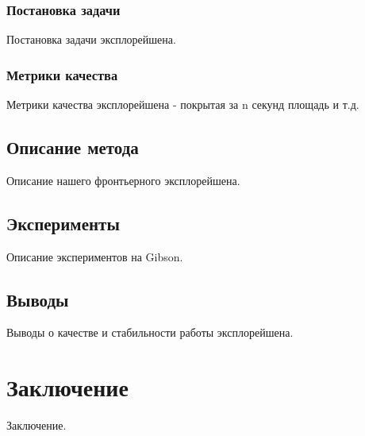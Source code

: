 \documentclass{mipt-thesis-ms}
\begin{document}
	\subsection{Постановка задачи}
	
	Постановка задачи эксплорейшена.
	
	\subsection{Метрики качества}
	
	Метрики качества эксплорейшена - покрытая за n секунд площадь и т.д.
	
	\section{Описание метода}
	
	Описание нашего фронтьерного эксплорейшена.
	
	\section{Эксперименты}
	
	Описание экспериментов на Gibson.
	
	\section{Выводы}
	
	Выводы о качестве и стабильности работы эксплорейшена.
	
	
	\chapter{Заключение}
	
	Заключение.
	
	\printbibliography
\end{document}
